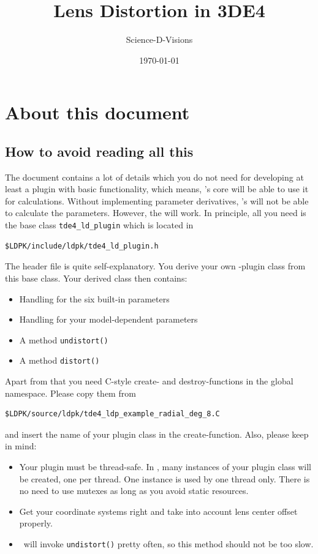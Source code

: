 \documentclass[10pt,a4paper]{article}
\title{Lens Distortion in 3DE4}
\author{Science-D-Visions}
\date{\today}
\begin{document}
\maketitle

\tableofcontents

\setcounter{section}{-1}
\newpage
\section{About this document}
%
\subsection{How to avoid reading all this}
The document contains a lot of details which you do not need
for developing at least a plugin with basic functionality,
which means, \tde's core will be able to use it for calculations.
Without implementing parameter derivatives, \tde's 
will not be able to calculate the parameters. However, the 
will work. In principle, all you need is the base class {\tt tde4\_ld\_plugin}
which is located in
\begin{verbatim}
$LDPK/include/ldpk/tde4_ld_plugin.h
\end{verbatim}
The header file is quite self-explanatory. You derive your own \tde-plugin
class from this base class. Your derived class then contains:
\begin{itemize}
\item Handling for the six built-in parameters
\item Handling for your model-dependent parameters
\item A method {\tt undistort()}
\item A method {\tt distort()}
\end{itemize}
Apart from that you need C-style create- and destroy-functions in the global namespace.
Please copy them from
\begin{verbatim}
$LDPK/source/ldpk/tde4_ldp_example_radial_deg_8.C
\end{verbatim}
and insert the name of your plugin class in the create-function.
Also, please keep in mind:
\begin{itemize}
\item Your plugin must be thread-safe. In \tde, many instances of your plugin class
will be created, one per thread. One instance is used by one thread only.
There is no need to use mutexes as long as you avoid static resources.
\item Get your coordinate systems right and take into account lens center offset properly.
\item \tde\ will invoke {\tt undistort()} pretty often, so this method should not be too slow.
\end{itemize}
\end{document}
